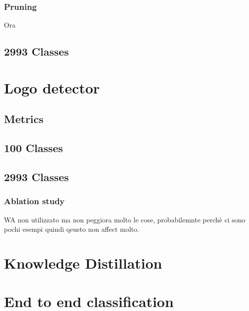 \subsubsection{Pruning}
Ora

\subsection{2993 Classes}
\label{sec:whole_dataset_clf}
\section{Logo detector}
\label{sec:exp-det}
\subsection{Metrics}
\subsection{100 Classes}
\subsection{2993 Classes}
\subsubsection{Ablation study}
WA non utilizzato ma non peggiora molto le cose, probabilemnte perchè ci sono pochi esempi quindi qeusto non affect molto.

\section{Knowledge Distillation}
\label{sec:exp-kd}
\section{End to end classification}
\label{sec:exp-end2end}

